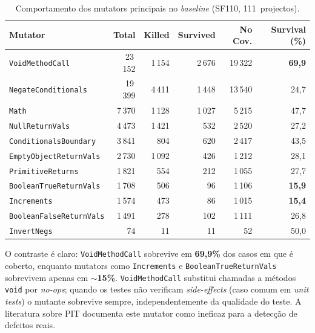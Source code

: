 \documentclass[12pt,a4paper]{article}
\begin{document}
\begin{table}[H]
  \centering
  \caption{Comportamento dos mutators principais no \textit{baseline} (SF110, 111~projectos).}
  \label{tab:mutators}
  \footnotesize
  \begin{tabular}{lrrrrr}
    \toprule
    \textbf{Mutator} & \textbf{Total} & \textbf{Killed} &
    \textbf{Survived} & \textbf{No Cov.} & \textbf{Survival (\%)} \\
    \midrule
    \texttt{VoidMethodCall}        & 23\,152 & 1\,154  & 2\,676 & 19\,322 & \textbf{69,9} \\
    \texttt{NegateConditionals}    & 19\,399 & 4\,411  & 1\,448 & 13\,540 & 24,7 \\
    \texttt{Math}                  &  7\,370 & 1\,128  & 1\,027 &  5\,215 & 47,7 \\
    \texttt{NullReturnVals}        &  4\,473 & 1\,421  &   532  &  2\,520 & 27,2 \\
    \texttt{ConditionalsBoundary}  &  3\,841 &   804   &   620  &  2\,417 & 43,5 \\
    \texttt{EmptyObjectReturnVals} &  2\,730 & 1\,092  &   426  &  1\,212 & 28,1 \\
    \texttt{PrimitiveReturns}      &  1\,821 &   554   &   212  &  1\,055 & 27,7 \\
    \texttt{BooleanTrueReturnVals} &  1\,708 &   506   &    96  &  1\,106 & \textbf{15,9} \\
    \texttt{Increments}            &  1\,574 &   473   &    86  &  1\,015 & \textbf{15,4} \\
    \texttt{BooleanFalseReturnVals}&  1\,491 &   278   &   102  &  1\,111 & 26,8 \\
    \texttt{InvertNegs}            &     74  &    11   &    11  &     52  & 50,0 \\
    \bottomrule
  \end{tabular}
\end{table}

\noindent
O contraste é claro: \texttt{VoidMethodCall} sobrevive em \textbf{69,9\%} dos casos em que
é coberto, enquanto mutators como \texttt{Increments} e \texttt{BooleanTrueReturnVals}
sobrevivem apenas em \textbf{$\sim$15\%}. \texttt{VoidMethodCall} substitui chamadas a
métodos \texttt{void} por \textit{no-ops}; quando os testes não verificam
\textit{side-effects} (caso comum em \textit{unit tests}) o mutante sobrevive sempre,
independentemente da qualidade do teste. A literatura sobre PIT documenta este mutator
como ineficaz para a detecção de defeitos reais.
\end{document}
